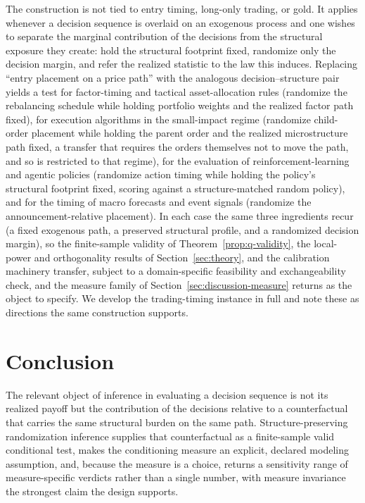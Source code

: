 \documentclass[risks,article,submit,pdftex,oneauthor]{Definitions/mdpi}
\begin{document}
The construction is not tied to entry timing, long-only trading, or gold. It
applies whenever a decision sequence is overlaid on an exogenous process and one wishes to
separate the marginal contribution of the decisions from the structural exposure they
create: hold the structural footprint fixed, randomize only the decision margin, and refer
the realized statistic to the law this induces. Replacing ``entry placement on a price
path'' with the analogous decision--structure pair yields a test for factor-timing and
tactical asset-allocation rules (randomize the rebalancing schedule while holding portfolio
weights and the realized factor path fixed), for execution algorithms in the small-impact
regime (randomize child-order placement while holding the parent order and the realized
microstructure path fixed, a transfer that requires the orders themselves not to move the
path, and so is restricted to that regime), for the evaluation of reinforcement-learning and
agentic policies (randomize action timing while holding the policy's structural footprint
fixed, scoring against a structure-matched random policy), and for the timing of macro
forecasts and event signals (randomize the announcement-relative placement). In each case
the same three ingredients recur (a fixed exogenous path, a preserved structural profile,
and a randomized decision margin), so the finite-sample validity of
Theorem~\ref{prop:q-validity}, the local-power and orthogonality results of
Section~\ref{sec:theory}, and the calibration machinery transfer, subject to a domain-specific
feasibility and exchangeability check, and the measure family of
Section~\ref{sec:discussion-measure} returns as the object to specify. We develop the trading-timing instance in full and note these
as directions the same construction supports.


\section{Conclusion}

The relevant object of inference in evaluating a decision sequence is not its
realized payoff but the contribution of the decisions relative to a counterfactual
that carries the same structural burden on the same path. Structure-preserving
randomization inference supplies that counterfactual as a finite-sample valid
conditional test, makes the conditioning measure an explicit, declared modeling assumption, and, because
the measure is a choice, returns a sensitivity range of measure-specific verdicts rather
than a single number, with measure invariance the strongest claim the design supports.
\end{document}
